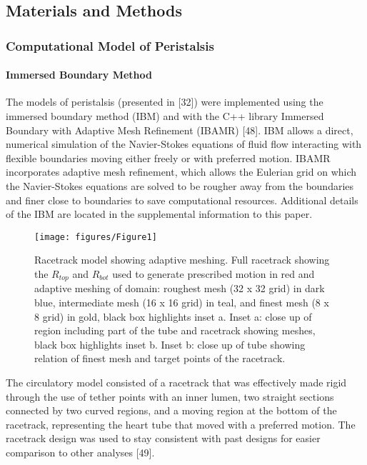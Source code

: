 \documentclass[
]{article}
\begin{document}
\hypertarget{materials-and-methods}{%
\subsection{Materials and Methods}\label{materials-and-methods}}

\hypertarget{computational-model-of-peristalsis}{%
\subsubsection{Computational Model of
Peristalsis}\label{computational-model-of-peristalsis}}

\hypertarget{immersed-boundary-method}{%
\paragraph{Immersed Boundary Method}\label{immersed-boundary-method}}

The models of peristalsis (presented in {[}32{]}) were implemented using
the immersed boundary method (IBM) and with the C++ library Immersed
Boundary with Adaptive Mesh Refinement (IBAMR) {[}48{]}. IBM allows a
direct, numerical simulation of the Navier-Stokes equations of fluid
flow interacting with flexible boundaries moving either freely or with
preferred motion. IBAMR incorporates adaptive mesh refinement, which
allows the Eulerian grid on which the Navier-Stokes equations are solved
to be rougher away from the boundaries and finer close to boundaries to
save computational resources. Additional details of the IBM are located
in the supplemental information to this paper.

\begin{figure}
\texttt{[image: figures/Figure1]} \caption{Racetrack model showing adaptive meshing. Full racetrack showing the $R_{top}$ and $R_{bot}$ used to generate prescribed motion in red and adaptive meshing of domain: roughest mesh (32 x 32 grid) in dark blue, intermediate mesh (16 x 16 grid) in teal, and finest mesh (8 x 8 grid) in gold, black box highlights inset a. Inset a: close up of region including part of the tube and racetrack showing meshes, black box highlights inset b. Inset b: close up of tube showing relation of finest mesh and target points of the racetrack. }\label{fig:grid-fig}
\end{figure}

The circulatory model consisted of a racetrack that was effectively made
rigid through the use of tether points with an inner lumen, two straight
sections connected by two curved regions, and a moving region at the
bottom of the racetrack, representing the heart tube that moved with a
preferred motion. The racetrack design was used to stay consistent with
past designs for easier comparison to other analyses {[}49{]}.
\end{document}
